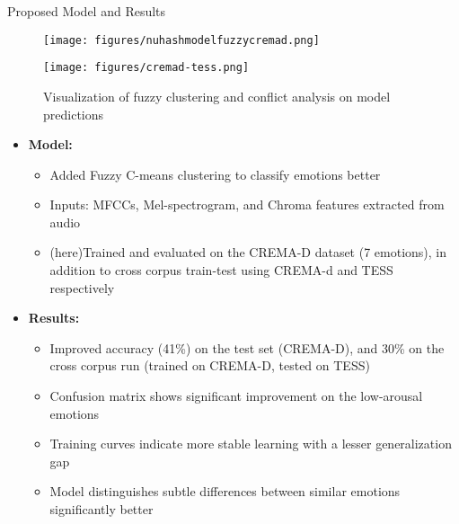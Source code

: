 \documentclass[final]{beamer}
\begin{document}
\begin{frame}[t]
\begin{minipage}[t]{0.42\textwidth}
\begin{block}{Proposed Model and Results}
    \begin{figure}[h!]
        \centering
        \begin{minipage}[b]{0.49\textwidth}
            \centering
            \texttt{[image: figures/nuhashmodelfuzzycremad.png]} %
            \caption{Visualization of fuzzy clustering and conflict analysis on model predictions}
            \label{fig:fuzzyviscrema}
        \end{minipage}
        \hfill
        \begin{minipage}[b]{0.49\textwidth}
            \centering
            \texttt{[image: figures/cremad-tess.png]} %
            \caption{Visualization of fuzzy clustering and conflict analysis on model predictions}
            \label{fig:fuzzyviscrematess}
        \end{minipage}
    \end{figure}

    \vspace{-1cm}
   \begin{itemize}
    \item \textbf{Model:}
    \begin{itemize}
        \item Added Fuzzy C-means clustering to classify emotions better
        \item Inputs: MFCCs, Mel-spectrogram, and Chroma features extracted from audio
        \item (here)Trained and evaluated on the CREMA-D dataset (7 emotions), in addition to cross corpus train-test using CREMA-d and TESS respectively
    \end{itemize}
    \item \textbf{Results:}
    \begin{itemize}
        \item Improved accuracy (41\%) on the test set (CREMA-D), and 30\% on the cross corpus run (trained on CREMA-D, tested on TESS)
        \item Confusion matrix shows significant improvement on the low-arousal emotions 
        \item Training curves indicate more stable learning with a lesser generalization gap
        \item Model distinguishes subtle differences between similar  emotions significantly better
    \end{itemize}
    \end{itemize}





\end{block}
\end{minipage}
\end{frame}
\end{document}
